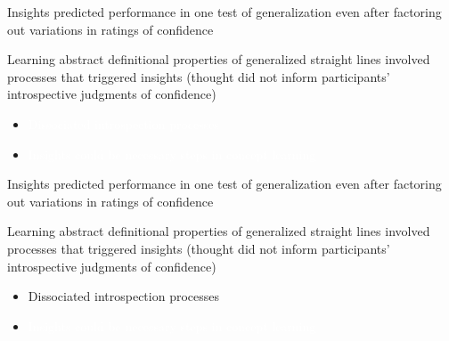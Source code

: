 \documentclass[11pt]{beamer}
\begin{document}
                    \begin{frame}
                      
                      Insights predicted performance in one test of generalization even after factoring out variations in ratings of confidence

                      Learning abstract definitional properties of generalized straight lines involved processes that triggered  insights (thought did not inform participants’ introspective judgments of confidence)

                      \begin{itemize}

                      \item{\textcolor{white}{Dissociated introspection processes }}

                      \item{\textcolor{white}{Insights could be necessary steps in concept learning }}

                      \end{itemize}


                    \end{frame}

                    \begin{frame}
                      
                      Insights predicted performance in one test of generalization even after factoring out variations in ratings of confidence

                      Learning abstract definitional properties of generalized straight lines involved processes that triggered  insights (thought did not inform participants’ introspective judgments of confidence)

                      \begin{itemize}

                        \item{Dissociated introspection processes }

                        \item{\textcolor{white}{Insights could be necessary steps in concept learning }}

                          \end{itemize}


                      \end{frame}
                    
\end{document}

